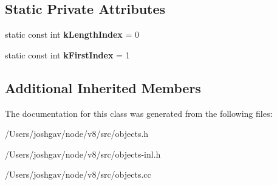 \subsection*{Static Private Attributes}
\begin{DoxyCompactItemize}
\item 
static const int {\bfseries k\+Length\+Index} = 0\hypertarget{classv8_1_1internal_1_1_array_list_a2a750c6b71423d67308436d2a3e489eb}{}\label{classv8_1_1internal_1_1_array_list_a2a750c6b71423d67308436d2a3e489eb}

\item 
static const int {\bfseries k\+First\+Index} = 1\hypertarget{classv8_1_1internal_1_1_array_list_a792087dc2a084bad9fd11aa8c8080ee2}{}\label{classv8_1_1internal_1_1_array_list_a792087dc2a084bad9fd11aa8c8080ee2}

\end{DoxyCompactItemize}
\subsection*{Additional Inherited Members}


The documentation for this class was generated from the following files\+:\begin{DoxyCompactItemize}
\item 
/\+Users/joshgav/node/v8/src/objects.\+h\item 
/\+Users/joshgav/node/v8/src/objects-\/inl.\+h\item 
/\+Users/joshgav/node/v8/src/objects.\+cc\end{DoxyCompactItemize}

